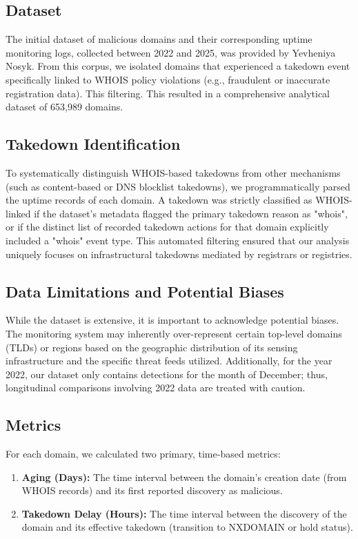 \documentclass[final, 9pt, twocolumn]{saucis}
\begin{document}
\subsection{Dataset}
The initial dataset of malicious domains and their corresponding uptime monitoring logs, collected between 2022 and 2025, was provided by Yevheniya Nosyk. From this corpus, we isolated domains that experienced a takedown event specifically linked to WHOIS policy violations (e.g., fraudulent or inaccurate registration data). This filtering. This resulted in a comprehensive analytical dataset of 653,989 domains.

\subsection{Takedown Identification}
To systematically distinguish WHOIS-based takedowns from other mechanisms (such as content-based or DNS blocklist takedowns), we programmatically parsed the uptime records of each domain. A takedown was strictly classified as WHOIS-linked if the dataset's metadata flagged the primary takedown reason as "whois", or if the distinct list of recorded takedown actions for that domain explicitly included a "whois" event type. This automated filtering ensured that our analysis uniquely focuses on infrastructural takedowns mediated by registrars or registries.

\subsection{Data Limitations and Potential Biases}
While the dataset is extensive, it is important to acknowledge potential biases. The monitoring system may inherently over-represent certain top-level domains (TLDs) or regions based on the geographic distribution of its sensing infrastructure and the specific threat feeds utilized. Additionally, for the year 2022, our dataset only contains detections for the month of December; thus, longitudinal comparisons involving 2022 data are treated with caution.


\subsection{Metrics}
For each domain, we calculated two primary, time-based metrics:
\begin{enumerate}
    \item \textbf{Aging (Days):} The time interval between the domain's creation date (from WHOIS records) and its first reported discovery as malicious.
    \item \textbf{Takedown Delay (Hours):} The time interval between the discovery of the domain and its effective takedown (transition to NXDOMAIN or hold status).
\end{enumerate}
\end{document}
